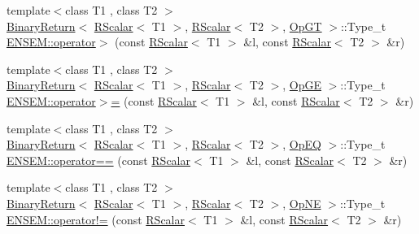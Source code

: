 \begin{DoxyCompactItemize}
\item 
{\footnotesize template$<$class T1 , class T2 $>$ }\\\mbox{\hyperlink{structENSEM_1_1BinaryReturn}{Binary\+Return}}$<$ \mbox{\hyperlink{classENSEM_1_1RScalar}{R\+Scalar}}$<$ T1 $>$, \mbox{\hyperlink{classENSEM_1_1RScalar}{R\+Scalar}}$<$ T2 $>$, \mbox{\hyperlink{structENSEM_1_1OpGT}{Op\+GT}} $>$\+::Type\+\_\+t \mbox{\hyperlink{group__rscalar_ga7e63d3683975042d12f1fb51499b95ff}{E\+N\+S\+E\+M\+::operator$>$}} (const \mbox{\hyperlink{classENSEM_1_1RScalar}{R\+Scalar}}$<$ T1 $>$ \&l, const \mbox{\hyperlink{classENSEM_1_1RScalar}{R\+Scalar}}$<$ T2 $>$ \&r)
\item 
{\footnotesize template$<$class T1 , class T2 $>$ }\\\mbox{\hyperlink{structENSEM_1_1BinaryReturn}{Binary\+Return}}$<$ \mbox{\hyperlink{classENSEM_1_1RScalar}{R\+Scalar}}$<$ T1 $>$, \mbox{\hyperlink{classENSEM_1_1RScalar}{R\+Scalar}}$<$ T2 $>$, \mbox{\hyperlink{structENSEM_1_1OpGE}{Op\+GE}} $>$\+::Type\+\_\+t \mbox{\hyperlink{group__rscalar_ga48e571bcedcc6e54b313673e6c64b759}{E\+N\+S\+E\+M\+::operator$>$=}} (const \mbox{\hyperlink{classENSEM_1_1RScalar}{R\+Scalar}}$<$ T1 $>$ \&l, const \mbox{\hyperlink{classENSEM_1_1RScalar}{R\+Scalar}}$<$ T2 $>$ \&r)
\item 
{\footnotesize template$<$class T1 , class T2 $>$ }\\\mbox{\hyperlink{structENSEM_1_1BinaryReturn}{Binary\+Return}}$<$ \mbox{\hyperlink{classENSEM_1_1RScalar}{R\+Scalar}}$<$ T1 $>$, \mbox{\hyperlink{classENSEM_1_1RScalar}{R\+Scalar}}$<$ T2 $>$, \mbox{\hyperlink{structENSEM_1_1OpEQ}{Op\+EQ}} $>$\+::Type\+\_\+t \mbox{\hyperlink{group__rscalar_ga7c4b4d964b61ea096a84dc01a77fee5b}{E\+N\+S\+E\+M\+::operator==}} (const \mbox{\hyperlink{classENSEM_1_1RScalar}{R\+Scalar}}$<$ T1 $>$ \&l, const \mbox{\hyperlink{classENSEM_1_1RScalar}{R\+Scalar}}$<$ T2 $>$ \&r)
\item 
{\footnotesize template$<$class T1 , class T2 $>$ }\\\mbox{\hyperlink{structENSEM_1_1BinaryReturn}{Binary\+Return}}$<$ \mbox{\hyperlink{classENSEM_1_1RScalar}{R\+Scalar}}$<$ T1 $>$, \mbox{\hyperlink{classENSEM_1_1RScalar}{R\+Scalar}}$<$ T2 $>$, \mbox{\hyperlink{structENSEM_1_1OpNE}{Op\+NE}} $>$\+::Type\+\_\+t \mbox{\hyperlink{group__rscalar_gacbd0811ec4f0f394ce57abefb7e699fc}{E\+N\+S\+E\+M\+::operator!=}} (const \mbox{\hyperlink{classENSEM_1_1RScalar}{R\+Scalar}}$<$ T1 $>$ \&l, const \mbox{\hyperlink{classENSEM_1_1RScalar}{R\+Scalar}}$<$ T2 $>$ \&r)
\item 

\end{DoxyCompactItemize}
